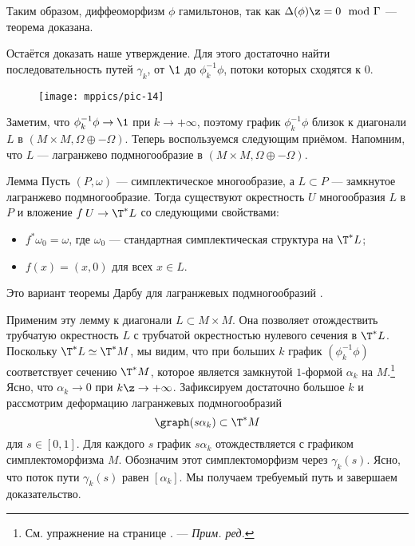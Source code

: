 Таким образом, диффеоморфизм $\phi$ гамильтонов, так как $\Delta(\phi) \z= 0 \mod{\Gamma}$  --- теорема доказана.

Остаётся доказать наше утверждение.
Для этого достаточно найти последовательность путей $\gamma_k$, от $\1$ до $\phi_k^{-1}\phi$, потоки которых сходятся к $0$.

\begin{figure}[ht!]
\centering
\texttt{[image: mppics/pic-14]}
\caption{}\label{pic-14}
\vskip0mm
\end{figure}

Заметим, что $\phi_k^{-1}\phi \to \1$ при $k \to +\infty$, поэтому график $\phi_k^{-1}\phi$ близок к диагонали $L$ в $(M \times M, \Omega \oplus -\Omega)$.
Теперь воспользуемся следующим приёмом.
Напомним, что $L$ --- лагранжево подмногообразие в $(M \times M, \Omega \oplus -\Omega)$.

\begin{thm}{Лемма}
Пусть $(P, \omega)$ --- симплектическое многообразие, а $L\subset P$ --- замкнутое лагранжево подмногообразие.
Тогда существуют окрестность $U$ многообразия $L$ в $P$ и вложение $f\: U \to \T^\ast L$ со следующими свойствами:
\begin{itemize}
\item $f^\ast\omega_0 = \omega$, где $\omega_0$ --- стандартная симплектическая структура на $\T^\ast L$;
\item $f(x) = (x,0)$ для всех $x\in L$.
\end{itemize}
\end{thm}
Это вариант теоремы Дарбу для лагранжевых подмногообразий \cite{MS}.

Применим эту лемму к диагонали $L \subset M \times M$.
Она позволяет отождествить трубчатую окрестность $L$ с трубчатой ​​окрестностью нулевого сечения в $\T^\ast L$.
Поскольку $\T^\ast L \simeq \T^\ast M$, мы видим, что при больших $k$ график $(\phi_k^{-1}\phi)$ соответствует сечению $\T^\ast M$, которое является замкнутой $1$-формой $\alpha_k$ на $M$.\footnote{См. упражнение на странице \pageref{1-form-lagrange}. --- \textit{Прим. ред.}}
Ясно, что $\alpha_k \to 0$ при $k\z\to +\infty$.
Зафиксируем достаточно большое $k$ и рассмотрим деформацию лагранжевых подмногообразий 
\[\graph (s\alpha_k) \subset \T^\ast M\]
для $s \in [0,1]$.
Для каждого $s$ график $s\alpha_k$ отождествляется с графиком симплектоморфизма $M$.
Обозначим этот симплектоморфизм через $\gamma_k(s)$.
Ясно, что поток пути $\gamma_k(s)$ равен $[\alpha_k]$.
Мы получаем требуемый путь и завершаем доказательство.
\qeds

